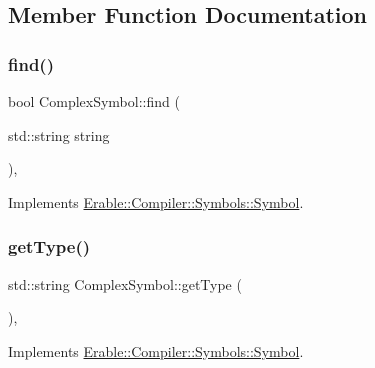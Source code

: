 \subsection{Member Function Documentation}
\mbox{\label{class_erable_1_1_compiler_1_1_symbols_1_1_complex_symbol_a0b1517a55182a14119c73b4c58192dde}} 
\subsubsection{\texorpdfstring{find()}{find()}}
{\footnotesize\ttfamily bool Complex\+Symbol\+::find (\begin{DoxyParamCaption}\item[{std\+::string}]{string }\end{DoxyParamCaption})\hspace{0.3cm}{\ttfamily [override]}, {\ttfamily [virtual]}}



Implements \mbox{\hyperlink{class_erable_1_1_compiler_1_1_symbols_1_1_symbol_ac1d8b1392aef2e93bd47520a86f8617f}{Erable\+::\+Compiler\+::\+Symbols\+::\+Symbol}}.

\mbox{\label{class_erable_1_1_compiler_1_1_symbols_1_1_complex_symbol_a868025e3a718e2ae6226a89403859b3a}} 
\subsubsection{\texorpdfstring{getType()}{getType()}}
{\footnotesize\ttfamily std\+::string Complex\+Symbol\+::get\+Type (\begin{DoxyParamCaption}{ }\end{DoxyParamCaption})\hspace{0.3cm}{\ttfamily [override]}, {\ttfamily [virtual]}}



Implements \mbox{\hyperlink{class_erable_1_1_compiler_1_1_symbols_1_1_symbol_a63b41d0942e5d65288fa3fc9d466ab43}{Erable\+::\+Compiler\+::\+Symbols\+::\+Symbol}}.

